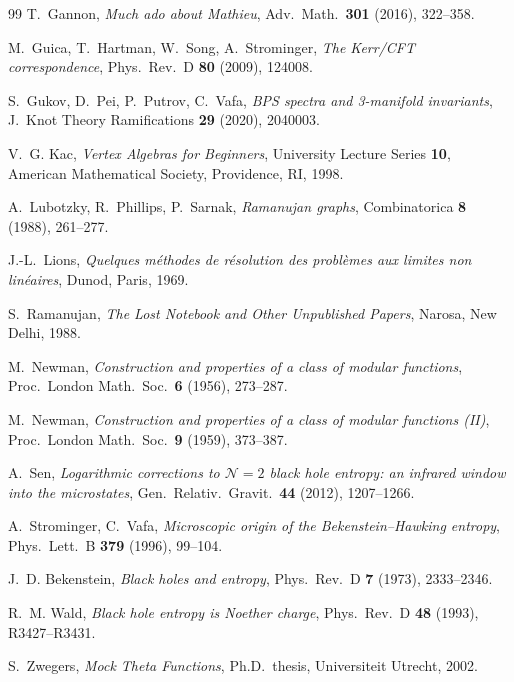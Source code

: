\documentclass[11pt,a4paper]{article}
\theoremstyle{plain}
\theoremstyle{definition}
\theoremstyle{remark}
\begin{document}
\begin{thebibliography}{99}
T.~Gannon,
\emph{Much ado about Mathieu},
Adv.\ Math.\ \textbf{301} (2016), 322--358.

M.~Guica, T.~Hartman, W.~Song, A.~Strominger,
\emph{The Kerr/CFT correspondence},
Phys.\ Rev.\ D \textbf{80} (2009), 124008.

S.~Gukov, D.~Pei, P.~Putrov, C.~Vafa,
\emph{BPS spectra and 3-manifold invariants},
J.\ Knot Theory Ramifications \textbf{29} (2020), 2040003.

V.~G. Kac,
\emph{Vertex Algebras for Beginners},
University Lecture Series \textbf{10}, American Mathematical Society, Providence, RI, 1998.

A.~Lubotzky, R.~Phillips, P.~Sarnak,
\emph{Ramanujan graphs},
Combinatorica \textbf{8} (1988), 261--277.

J.-L.~Lions,
\emph{Quelques m\'ethodes de r\'esolution des probl\`emes aux limites non lin\'eaires},
Dunod, Paris, 1969.

S.~Ramanujan,
\emph{The Lost Notebook and Other Unpublished Papers},
Narosa, New Delhi, 1988.

M.~Newman,
\emph{Construction and properties of a class of modular functions},
Proc.\ London Math.\ Soc.\ \textbf{6} (1956), 273--287.

M.~Newman,
\emph{Construction and properties of a class of modular functions (II)},
Proc.\ London Math.\ Soc.\ \textbf{9} (1959), 373--387.

A.~Sen,
\emph{Logarithmic corrections to $\mathcal{N} = 2$ black hole entropy:
an infrared window into the microstates},
Gen.\ Relativ.\ Gravit.\ \textbf{44} (2012), 1207--1266.

A.~Strominger, C.~Vafa,
\emph{Microscopic origin of the Bekenstein--Hawking entropy},
Phys.\ Lett.\ B \textbf{379} (1996), 99--104.

J.~D. Bekenstein,
\emph{Black holes and entropy},
Phys.\ Rev.\ D \textbf{7} (1973), 2333--2346.

R.~M. Wald,
\emph{Black hole entropy is Noether charge},
Phys.\ Rev.\ D \textbf{48} (1993), R3427--R3431.

S.~Zwegers,
\emph{Mock Theta Functions},
Ph.D.\ thesis, Universiteit Utrecht, 2002.

\end{thebibliography}
\end{document}
